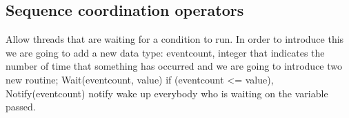 \documentclass{article}
\begin{document}
    \subsection{Sequence coordination operators} Allow threads that are waiting for a condition
      to run. In order to introduce this we are going to add a new data type: eventcount, integer
      that indicates the number of time that something has occurred and we are going to 
      introduce two new routine; Wait(eventcount, value) if (eventcount <= value), Notify(eventcount)
      notify wake up everybody who is waiting on the variable passed.
\end{document}
